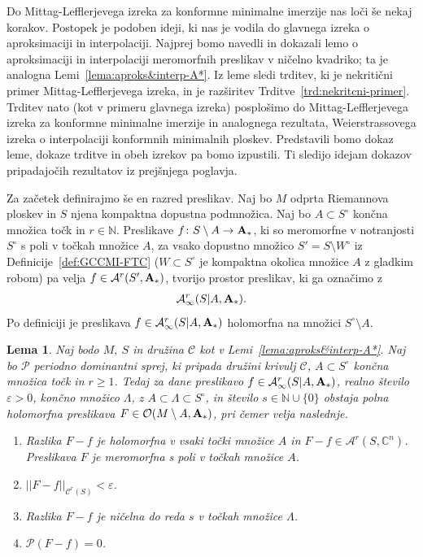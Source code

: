 \documentclass[12pt,a4paper,twoside]{article}
\theoremstyle{definition} %
\theoremstyle{plain} %
\newtheorem{lema}[definicija]{Lema}
\numberwithin{equation}{section}  %
\newcommand{\N}{\mathbb N}
\begin{document}
Do Mittag-Lefflerjevega izreka za konformne minimalne imerzije nas loči še nekaj korakov. Postopek je podoben ideji, ki nas je vodila do glavnega izreka o aproksimaciji in interpolaciji. Najprej bomo navedli in dokazali lemo o aproksimaciji in interpolaciji meromorfnih preslikav v ničelno kvadriko; ta je analogna Lemi~\ref{lema:aproks&interp-A*}.
Iz leme sledi trditev, ki je nekritični primer Mittag-Lefflerjevega izreka, in je razširitev Trditve~\ref{trd:nekritcni-primer}.
Trditev nato (kot v primeru glavnega izreka) posplošimo do Mittag-Lefflerjevega izreka za konformne minimalne imerzije in analognega rezultata, Weierstrassovega izreka o interpolaciji konformnih minimalnih ploskev.
Predstavili bomo dokaz leme, dokaze trditve in obeh izrekov pa bomo izpustili. Ti sledijo idejam dokazov pripadajočih rezultatov iz prejšnjega poglavja.

Za začetek definirajmo še en razred preslikav.
Naj bo $M$ odprta Riemannova ploskev in $S$ njena kompaktna dopustna podmnožica. Naj bo $A \subset S^{\circ}$ končna množica točk in $r \in \N$.
Preslikave $f \colon S \setminus A \to \textup{\textbf{A}}_{*}$, ki so meromorfne v notranjosti $S^{\circ}$ s poli v točkah množice $A$, za vsako dopustno množico $S' = S \setminus W^{\circ}$ iz Definicije~\ref{def:GCCMI-FTC} ($W \subset S^{\circ}$ je kompaktna okolica množice $A$ z gladkim robom) pa velja $f \in \mathcal{A}^{r}(S', \textup{\textbf{A}}_{*})$, tvorijo prostor preslikav, ki ga označimo z 
\begin{gather*}
\mathcal{A}_{\infty}^{r}(S|A, \textup{\textbf{A}}_{*}).
\end{gather*}
Po definiciji je preslikava $f \in \mathcal{A}_{\infty}^{r}(S|A, \textup{\textbf{A}}_{*})$ holomorfna na množici $S^{\circ} \setminus A$.

\begin{lema} \label{lema:ML-pomozna-lema}
Naj bodo $M, \ S$ in družina $\mathcal{C}$ kot v Lemi~\ref{lema:aproks&interp-A*}. Naj bo $\mathcal{P}$ periodno dominantni sprej, ki pripada družini krivulj $\mathcal{C}$, $A \subset S^{\circ}$ končna množica točk in $r \geq 1$.
Tedaj za dane preslikavo $f \in \mathcal{A}_{\infty}^{r}(S|A, \textup{\textbf{A}}_{*})$, realno število $\varepsilon > 0$, končno množico $\Lambda$, z $A \subset \Lambda \subset S^{\circ}$, in število $s \in \mathbb{N} \cup \{0\}$ obstaja polna holomorfna preslikava $F \in \mathcal{O}(M \setminus A, \textup{\textbf{A}}_{*})$, pri čemer velja naslednje.
\begin{enumerate}
\item Razlika $F-f$ je holomorfna v vsaki točki množice $A$ in $F-f \in \mathcal{A}^{r}(S, \mathbb{C}^{n})$. Preslikava $F$ je meromorfna s poli v točkah množice $A$.
\item $ ||F-f||_{\mathcal{C}^{r}(S)} < \varepsilon$.
\item Razlika $F-f$ je ničelna do reda $s$ v točkah množice $\Lambda$.
\item $\mathcal{P}(F-f) = 0$.
\end{enumerate}
\end{lema}
\end{document}
